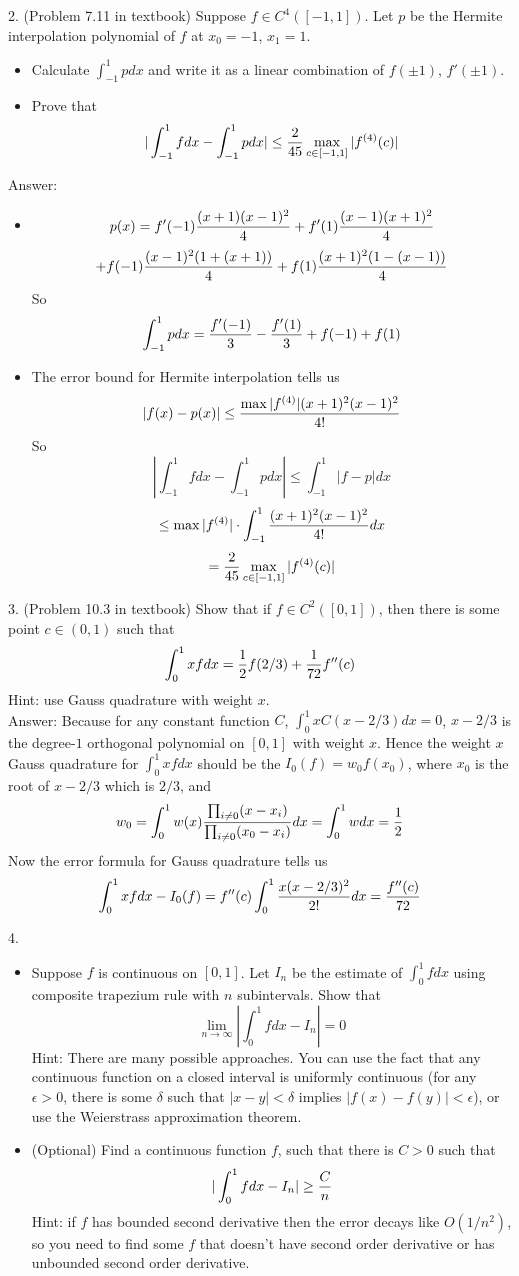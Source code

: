 \documentclass{article} %
\theoremstyle{break}
\begin{document}
2. (Problem 7.11 in textbook) Suppose $f\in C^4([-1, 1])$. Let $p$ be the Hermite interpolation polynomial of $f$ at $x_0=-1$, $x_1=1$.
\begin{itemize}
\item Calculate $\int_{-1}^1pdx$ and write it as a linear combination of $f(\pm 1)$, $f'(\pm 1)$.
\item Prove that
  \[|\int_{-1}^1fdx-\int_{-1}^1pdx|\leq {2\over 45}\max_{c\in [-1, 1]}|f^{(4)}(c)|\]
\end{itemize}

Answer:
\begin{itemize}
\item
  \[p(x)=f'(-1){(x+1)(x-1)^2\over 4}+f'(1){(x-1)(x+1)^2\over 4}\]
  \[+f(-1){(x-1)^2(1+(x+1))\over 4}+f(1){(x+1)^2(1-(x-1))\over 4}\]
  So
  \[\int_{-1}^1 pdx={f'(-1)\over 3}-{f'(1)\over 3}+f(-1)+f(1)\]
\item The error bound for Hermite interpolation tells us
  \[|f(x)-p(x)|\leq {\max|f^{(4)}|(x+1)^2(x-1)^2\over 4!}\]
  So
  \[|\int_{-1}^1fdx-\int_{-1}^1pdx|\leq \int_{-1}^1|f-p|dx\]
  \[\leq \max|f^{(4)}|\cdot \int_{-1}^1 {(x+1)^2(x-1)^2\over 4!}dx\]
    \[={2\over 45}\max_{c\in [-1, 1]}|f^{(4)}(c)|\]
\end{itemize}



3. (Problem 10.3 in textbook) Show that if $f\in C^2([0, 1])$, then there is some point $c\in (0, 1)$ such that
\[\int_0^1xfdx={1\over 2}f(2/3)+{1\over 72}f''(c)\]
Hint: use Gauss quadrature with weight $x$.\\

Answer: Because for any constant function $C$, $\int_0^1xC(x-2/3)dx=0$, $x-2/3$ is the degree-$1$ orthogonal polynomial on $[0, 1]$ with weight $x$. Hence the weight $x$ Gauss quadrature for $\int_0^1xfdx$ should be the $I_0(f)=w_0f(x_0)$, where $x_0$ is the root of $x-2/3$ which is $2/3$, and
\[w_0=\int_0^1w(x){\prod_{i\not=0}(x-x_i)\over \prod_{i\not=0}(x_0-x_i)}dx=\int_0^1wdx={1\over 2}\]
Now the error formula for Gauss quadrature tells us
\[\int_0^1xfdx-I_0(f)=f''(c)\int_0^1{x(x-2/3)^2\over 2!}dx={f''(c)\over 72}\]

4. \begin{itemize}
\item Suppose $f$ is continuous on $[0, 1]$. Let $I_n$ be the estimate of $\int_0^1fdx$ using composite trapezium rule with $n$ subintervals. Show that
  \[\lim_{n\rightarrow\infty}|\int_0^1fdx-I_n|=0\]
 Hint: There are many possible approaches. You can use the fact that any continuous function on a closed interval is uniformly continuous (for any $\epsilon>0$, there is some $\delta$ such that $|x-y|<\delta$ implies $|f(x)-f(y)|<\epsilon$), or use the Weierstrass approximation theorem.
\item (Optional) Find a continuous function $f$, such that there is $C>0$ such that 
  \[|\int_0^1fdx-I_n|\geq {C\over n}\]
  Hint: if $f$ has bounded second derivative then the error decays like $O(1/n^2)$, so you need to find some $f$ that doesn't have second order derivative or has unbounded second order derivative.
\end{itemize}
\end{document}
